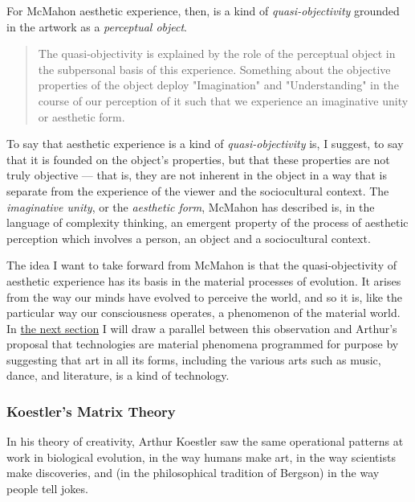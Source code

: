             For McMahon aesthetic experience, then, is a kind of \emph{quasi-objectivity} grounded in the artwork as a \emph{perceptual object}.

            \begin{quotation}
                The quasi-objectivity is explained by the role of the perceptual object in the subpersonal basis of this experience. Something about the objective properties of the object deploy "Imagination" and "Understanding" in the course of our perception of it such that we experience an imaginative unity or aesthetic form. \citep[p.51]{McMahonCrtclAsthtcRlsm2011}
            \end{quotation}

            To say that aesthetic experience is a kind of \emph{quasi-objectivity} is, I suggest, to say that it is founded on the object's properties, but that these properties are not truly objective — that is, they are not inherent in the object in a way that is separate from the experience of the viewer and the sociocultural context. The \emph{imaginative unity}, or the \emph{aesthetic form}, McMahon has described is, in the language of complexity thinking, an emergent property of the process of aesthetic perception which involves a person, an object and a sociocultural context.

            The idea I want to take forward from McMahon is that the quasi-objectivity of aesthetic experience has its basis in the material processes of evolution. It arises from the way our minds have evolved to perceive the world, and so it is, like the particular way our consciousness operates, a phenomenon of the material world. In \hyperref[ch:ArtAsTechnology]{the next section} I will draw a parallel between this observation and Arthur's proposal that technologies are material phenomena programmed for purpose by suggesting that art in all its forms, including the various arts such as music, dance, and literature, is a kind of technology.

        \subsubsection{Koestler's Matrix Theory} \label{sec:MatrixTheory} 

            In his theory of creativity, Arthur Koestler saw the same operational patterns at work in biological evolution, in the way humans make art, in the way scientists make discoveries, and (in the philosophical tradition of Bergson) in the way people tell jokes.
            
